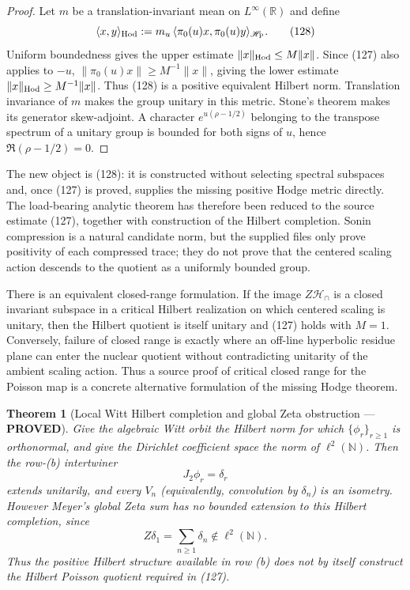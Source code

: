 \documentclass[11pt]{article}
\newtheorem{theorem}{Theorem}
\newcommand{\PROVED}{\textcolor{green!45!black}{\textbf{PROVED}}}
\begin{document}
\begin{proof}
Let $m$ be a translation-invariant mean on $L^\infty(\mathbb R)$ and define
\begin{equation}
 \langle x,y\rangle_{\rm Hod}
 :=m_u\,\langle\pi_0(u)x,\pi_0(u)y\rangle_{\mathscr H_{\rm P}}. \tag{128}
\end{equation}
Uniform boundedness gives the upper estimate
$\|x\|_{\rm Hod}\le M\|x\|$.  Since (127) also applies to $-u$,
$\|\pi_0(u)x\|\ge M^{-1}\|x\|$, giving the lower estimate
$\|x\|_{\rm Hod}\ge M^{-1}\|x\|$.  Thus (128) is a positive equivalent
Hilbert norm.  Translation invariance of $m$ makes the group unitary in this
metric.  Stone's theorem makes its generator skew-adjoint.  A character
$e^{u(\rho-1/2)}$ belonging to the transpose spectrum of a unitary group is
bounded for both signs of $u$, hence $\Re(\rho-1/2)=0$.
\end{proof}

The new object is (128): it is constructed without selecting spectral
subspaces and, once (127) is proved, supplies the missing positive Hodge
metric directly.  The load-bearing analytic theorem has therefore been
reduced to the source estimate (127), together with construction of the
Hilbert completion.  Sonin compression is a natural candidate norm, but the
supplied files only prove positivity of each compressed trace; they do not
prove that the centered scaling action descends to the quotient as a
uniformly bounded group.

There is an equivalent closed-range formulation.  If the image
$Z\mathcal H_\cap$ is a closed invariant subspace in a critical Hilbert
realization on which centered scaling is unitary, then the Hilbert quotient
is itself unitary and (127) holds with $M=1$.  Conversely, failure of closed
range is exactly where an off-line hyperbolic residue plane can enter the
nuclear quotient without contradicting unitarity of the ambient scaling
action.  Thus a source proof of critical closed range for the Poisson map is
a concrete alternative formulation of the missing Hodge theorem.

\begin{theorem}[Local Witt Hilbert completion and global Zeta obstruction
--- \PROVED]
Give the algebraic Witt orbit the Hilbert norm for which
$\{\phi_r\}_{r\ge1}$ is orthonormal, and give the Dirichlet coefficient
space the norm of $\ell^2(\mathbb N)$.  Then the row-(b) intertwiner
\begin{equation}
 J_2\phi_r=\delta_r                                      \tag{129}
\end{equation}
extends unitarily, and every $V_n$ (equivalently, convolution by $\delta_n$)
is an isometry.  However Meyer's global Zeta sum has no bounded extension to
this Hilbert completion, since
\begin{equation}
 Z\delta_1=\sum_{n\ge1}\delta_n\notin\ell^2(\mathbb N). \tag{130}
\end{equation}
Thus the positive Hilbert structure available in row (b) does not by itself
construct the Hilbert Poisson quotient required in (127).
\end{theorem}
\end{document}
